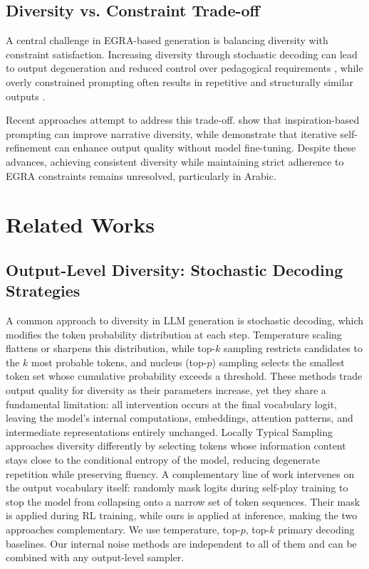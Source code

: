 \documentclass[11pt]{article}
\begin{document}
\subsection{Diversity vs. Constraint Trade-off}

A central challenge in EGRA-based generation is balancing diversity with constraint satisfaction. Increasing diversity through stochastic decoding can lead to output degeneration and reduced control over pedagogical requirements \cite{holtzman2020curious}, while overly constrained prompting often results in repetitive and structurally similar outputs \cite{rai2024measuring}. 

Recent approaches attempt to address this trade-off. \citet{shankarnarayanan2024once} show that inspiration-based prompting can improve narrative diversity, while \citet{madaan2023selfrefine} demonstrate that iterative self-refinement can enhance output quality without model fine-tuning. Despite these advances, achieving consistent diversity while maintaining strict adherence to EGRA constraints remains unresolved, particularly in Arabic.


\section{Related Works}

\subsection{Output-Level Diversity: Stochastic Decoding Strategies}

A common approach to diversity in LLM generation is stochastic decoding, which modifies the token probability distribution at each step. Temperature scaling \cite{ackley1985learning} flattens or sharpens this distribution, while top-$k$ sampling \cite{fan2018hierarchical} restricts candidates to the $k$ most probable tokens, and nucleus (top-$p$) sampling \cite{holtzman2020curious} selects the smallest token set whose cumulative probability exceeds a threshold. These methods
trade output quality for diversity as their parameters increase, yet they share a fundamental limitation: all intervention occurs at the final vocabulary logit, leaving the model's internal computations, embeddings, attention patterns, and intermediate
representations entirely unchanged. Locally Typical Sampling \cite{meister2023locally} approaches diversity differently by selecting tokens whose information content stays close to the conditional entropy of the model, reducing degenerate repetition while preserving fluency. A complementary line of work intervenes on the output vocabulary itself: \citet{dineen2026vocabularydropoutcurriculumdiversity} randomly mask logits during self-play training to stop the model from collapsing onto a narrow set of token sequences. Their mask is applied during RL training, while ours is applied at inference, making the two approaches complementary. We use temperature, top-$p$, top-$k$ primary decoding baselines. Our internal noise methods are independent to all of them and can be combined with any output-level sampler.
\end{document}
